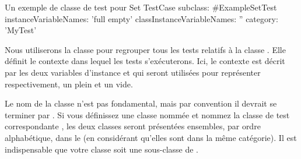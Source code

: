 \documentclass[a4paper,10pt,twoside]{book}
\begin{document}
\begin{classdef}[exampleSetTest]{Un exemple de classe de test pour Set}
TestCase subclass: #ExampleSetTest
	instanceVariableNames: 'full empty'
	classInstanceVariableNames: ''
	category: 'MyTest'
\end{classdef}
% 

Nous utiliserons la classe  pour regrouper tous les tests relatifs
à la classe . Elle définit le contexte dans lequel les tests s'exécuterons. Ici, le contexte est décrit par les deux variables d'instance  et  qui seront utilisées pour représenter respectivement, un  plein et un  vide.

Le nom de la classe n'est pas fondamental, mais par convention il devrait se terminer par .
Si vous définissez une classe nommée  et nommez la classe de test correspondante , les deux classes seront présentées ensembles, par ordre alphabétique, dans le  (en considérant qu'elles sont dans la même catégorie). Il est indispensable que votre classe soit une sous-classe de .

\end{document}
